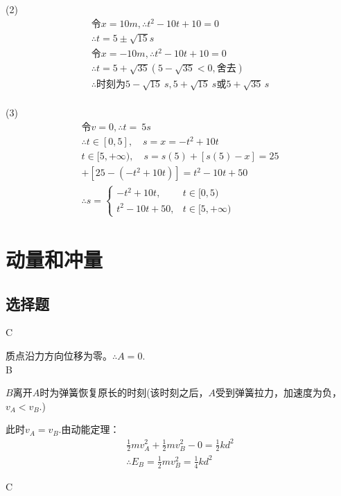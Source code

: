 \documentclass[b5paper,opensource]{./template/qyxf-book}
\begin{document}
(2)
\begin{gather*}
\text{令}x=10m,\therefore t^2-10t+10=0\\
\therefore t=5\pm\sqrt{15}s\\
\text{令}x=-10m,\therefore t^2-10t+10=0\\
\therefore t=5+\sqrt{35}(5-\sqrt{35}<0,\text{舍去})\\
\therefore\text{时刻为}5-\sqrt{15}\ s,5+\sqrt{15}\ s\text{或}5+\sqrt{35}\,s\\
\end{gather*}

(3)
\begin{gather*}
\text{令}v=0,\therefore t=\ 5s\\
\therefore t\in[0,5],\quad s=x=-t^2+10t\\
t\in[5,+\infty),\quad s=s(5)+[s(5)-x]=25\\+[25-(-t^2+10t)]
=t^2-10t+50\\
\therefore s=
\begin{cases}
-t^2+10t,&t\in[0,5)\\
t^2-10t+50,&t\in[5,+\infty)
\end{cases}
\end{gather*}

\chapter{动量和冲量}
\section{选择题}

C
	
	\solve
质点沿力方向位移为零。$\therefore A=0$.\\

B

\solve
$B$离开$A$时为弹簧恢复原长的时刻(该时刻之后，$A$受到弹簧拉力，加速度为负，$v_A<v_B$.)\par
此时$v_A=v_B$.由动能定理：
\begin{align*}
\frac{1}{2}mv_A^2+\frac{1}{2}mv_B^2-0=\frac{1}{2}kd^2\\
\therefore{}E_B=\frac{1}{2}mv_B^2=\frac{1}{4}kd^2
\end{align*}

C
\end{document}
